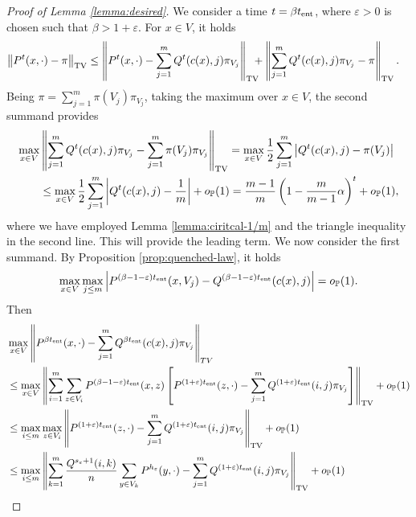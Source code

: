 \documentclass[11pt,oneside]{amsart}
\numberwithin{equation}{section}  %
\theoremstyle{plain}
\newcommand{\eps}{\varepsilon}
\newcommand{\p}{\mathbb{P}}
\newcommand{\op}{o_{\p}}
\newcommand{\tv}[1]{\left\|#1\right\|_{\rm TV}}
\newcommand{\tent}{t_{\textup{ent}}}
\newcommand{\semi}{{Q}}
\newcommand{\h}{{h_\eps}}
\newcommand{\s}{{s_\eps}}
\begin{document}
\begin{proof}[Proof of Lemma \ref{lemma:desired}] 
We consider a time $t=\beta\tent$,
where $\eps>0$ is chosen such that $\beta>1+\eps$. For $x \in V$,
it holds
\begin{equation}
	\begin{split}
		\tv { P^{t}(x,\cdot)-\pi} 
		& \le \tv { P^{t}(x,\cdot)-\sum_{j=1}^m \semi^{t}(c(x),j) \pi_{V_j}}   \!\!\!\! +
		\tv { \sum_{j=1}^m \semi^{t}(c(x),j) {\pi_{V_j}}-\pi}.
	\end{split}
\end{equation}
Being $\pi= \sum_{j=1}^m\pi(V_j) {\pi_{V_j}}$, taking the maximum over $x\in V$, the second summand provides
\begin{equation} \label{eq:spirit}
	\begin{split}
		\max_{x \in V}&\tv { \sum_{j=1}^m \semi^{t}(c(x),j){\pi_{V_j}} -\sum_{j=1}^m\pi(V_j) {\pi_{V_j}} }
		= \max_{x \in V}\frac12 \sum_{j=1}^m \left|\semi ^{t}(c(x),j) -\pi(V_j)\right|\\
		& \le  \max_{x \in V}\frac12 \sum_{j=1}^m \left|\semi^{t}(c(x),j) -\frac 1m\right|+\op(1)
		=\frac{m-1}m \left(1-\frac{m}{m-1}\alpha\right)^{t}+\op(1),
	\end{split}
\end{equation}
where we have employed Lemma \ref{lemma:ciritcal-1/m} and the triangle inequality in the second line. This will provide the leading term. 
We now consider the first summand.
By Proposition \ref{prop:quenched-law}, it holds
\begin{equation}
	\max_{x \in V}\max_{j \le m}\left|P^{(\beta-1-\eps)\tent}(x,V_j) - \semi ^{(\beta-1-\eps)\tent} (c(x),j)\right|=\op(1).
\end{equation}
Then
\begin{equation} \label{eq:bounds}
	\begin{split}
		&\max_{x \in V}\left\| P^{\beta \tent}(x,\cdot)- \sum_{j=1}^m  \semi^{\beta \tent}(c(x),j) \pi_{V_j} \right\|_{TV} \\
		& \le \max_{x \in V}\tv{ \sum_{i=1}^m \sum_{z \in V_i} P^{(\beta-1-\eps)\tent}(x,z) \left[P^{(1+\eps)\tent}(z,\cdot)- \sum_{j=1}^m \semi^{(1+\eps)\tent}(i,j)\pi_{V_j} \right]}+\op(1)\\
		& \le \max_{i \le m} \max_{z \in V_i} \tv{ P^{(1+\eps)\tent}(z,\cdot)- \sum_{j=1}^m \semi^{(1+\eps)\tent}(i,j)\pi_{V_j}}+\op(1) \\
		& \le \max_{i \le m}  \tv{ \sum_{k=1}^m\frac{\semi^{\s+1}(i,k)}{n}\sum_{y \in V_k}P^{\h}(y,\cdot)- \sum_{j=1}^m \semi^{(1+\eps)\tent}(i,j)\pi_{V_j}}+\op(1) 

\end{split}
\end{equation}
\end{proof}
\end{document}

